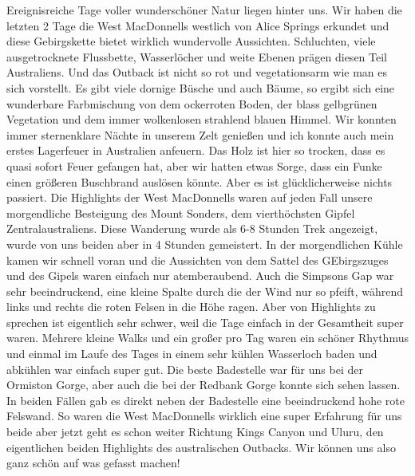 \documentclass[11pt]{book}
\begin{document}
Ereignisreiche Tage voller wunderschöner Natur liegen hinter uns. Wir haben die letzten 2 Tage die West MacDonnells westlich von 
Alice Springs erkundet und diese Gebirgskette bietet wirklich wundervolle Aussichten. Schluchten, viele ausgetrocknete Flussbette, 
Wasserlöcher und weite Ebenen prägen diesen Teil Australiens. Und das Outback ist nicht so rot und vegetationsarm wie man es sich 
vorstellt. Es gibt viele dornige Büsche und auch Bäume, so ergibt sich eine wunderbare Farbmischung von dem ockerroten Boden, 
der blass gelbgrünen Vegetation und dem immer wolkenlosen strahlend blauen Himmel. Wir konnten immer sternenklare Nächte in 
unserem Zelt genießen und ich konnte auch mein erstes Lagerfeuer in Australien anfeuern. Das Holz ist hier so trocken, dass es 
quasi sofort Feuer gefangen hat, aber wir hatten etwas Sorge, dass ein Funke einen größeren Buschbrand auslösen könnte. Aber es 
ist glücklicherweise nichts passiert. Die Highlights der West MacDonnells waren auf jeden Fall unsere morgendliche Besteigung des 
Mount Sonders, dem vierthöchsten Gipfel Zentralaustraliens. Diese Wanderung wurde als 6-8 Stunden Trek angezeigt, wurde von uns 
beiden aber in 4 Stunden gemeistert. In der morgendlichen Kühle kamen wir schnell voran und die Aussichten von dem Sattel des 
GEbirgszuges und des Gipels waren einfach nur atemberaubend. Auch die Simpsons Gap war sehr beeindruckend, eine kleine Spalte durch 
die der Wind nur so pfeift, während links und rechts die roten Felsen in die Höhe ragen. Aber von Highlights zu sprechen ist eigentlich
sehr schwer, weil die Tage einfach in der Gesamtheit super waren. Mehrere kleine Walks und ein großer pro Tag waren ein schöner Rhythmus 
und einmal im Laufe des Tages in einem sehr kühlen Wasserloch baden und abkühlen war einfach super gut. Die beste Badestelle war für 
uns bei der Ormiston Gorge, aber auch die bei der Redbank Gorge konnte sich sehen lassen. In beiden Fällen gab es direkt neben der 
Badestelle eine beeindruckend hohe rote Felswand. So waren die West MacDonnells wirklich eine super Erfahrung für uns beide aber 
jetzt geht es schon weiter Richtung Kings Canyon und Uluru, den eigentlichen beiden Highlights des australischen Outbacks. Wir können 
uns also ganz schön auf was gefasst machen!
\end{document}
